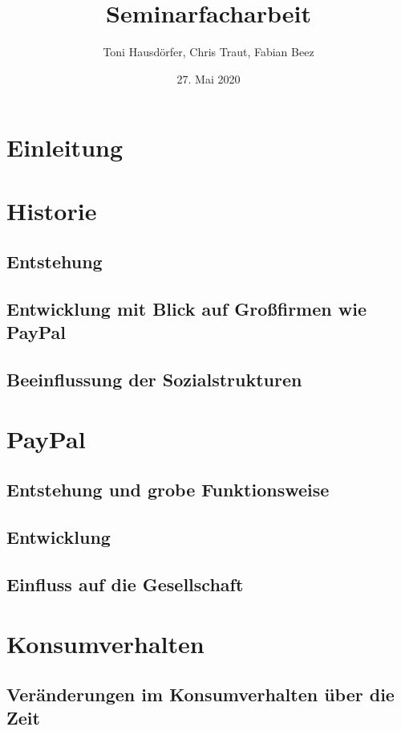 \documentclass[a4paper, 10pt]{scrartcl}
\title{Seminarfacharbeit}
\author{Toni Hausdörfer, Chris Traut, Fabian Beez}
\date{27. Mai 2020}
\begin{document}
    
    \maketitle \newpage
    \tableofcontents \newpage

    \section{Einleitung}
        
        \newpage
    
    \section{Historie}
        \subsection{Entstehung}
        \subsection{Entwicklung mit Blick auf Großfirmen wie PayPal}
        \subsection{Beeinflussung der Sozialstrukturen}
        
    \section{PayPal}
        \subsection{Entstehung und grobe Funktionsweise}
        \subsection{Entwicklung}
        \subsection{Einfluss auf die Gesellschaft}
        
    \section{Konsumverhalten}
        \subsection{Veränderungen im Konsumverhalten über die Zeit}
            
            
\end{document}
